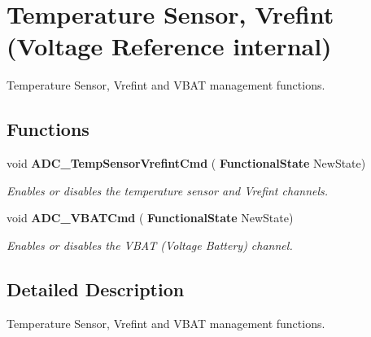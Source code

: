 \section{Temperature Sensor, Vrefint (Voltage Reference internal)}
\label{group__ADC__Group3}


Temperature Sensor, Vrefint and V\+B\+AT management functions.  


\subsection*{Functions}
\begin{DoxyCompactItemize}
\item 
void \textbf{ A\+D\+C\+\_\+\+Temp\+Sensor\+Vrefint\+Cmd} (\textbf{ Functional\+State} New\+State)
\begin{DoxyCompactList}\small\item\em Enables or disables the temperature sensor and Vrefint channels. \end{DoxyCompactList}\item 
void \textbf{ A\+D\+C\+\_\+\+V\+B\+A\+T\+Cmd} (\textbf{ Functional\+State} New\+State)
\begin{DoxyCompactList}\small\item\em Enables or disables the V\+B\+AT (Voltage Battery) channel. \end{DoxyCompactList}\end{DoxyCompactItemize}


\subsection{Detailed Description}
Temperature Sensor, Vrefint and V\+B\+AT management functions. 

